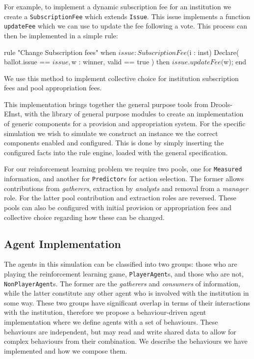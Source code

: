 For example, to implement a dynamic subscription fee for an institution we
create a \texttt{SubscriptionFee} which extends \texttt{Issue}. This issue
implements a function \texttt{updateFee} which we can use to update the fee
following a vote. This process can then be implemented in a simple rule:

\begin{droolsinline}
rule "Change Subscription fees"
	when
		$issue : SubscriptionFee($i : inst)
		Declare( ballot.issue == $issue, $w : winner, valid == true )
	then
		$issue.updateFee($w);
end
\end{droolsinline}

We use this method to implement collective choice for institution subscription
fees and pool appropriation fees.


This implementation brings together the general purpose tools from Drools-
EInst, with the library of general purpose modules to create an implementation
of generic components for a provision and appropriation system. For the
specific simulation we wish to simulate we construct an instance we the
correct components enabled and configured. This is done by simply inserting
the configured facts into the rule engine, loaded with the general
specification.

For our reinforcement learning problem we require two pools, one for
\texttt{Measured} information, and another for \texttt{Predictor}s for action
selection. The former allows contributions from \emph{gatherers}, extraction
by \emph{analysts} and removal from a \emph{manager} role. For the latter pool
contribution and extraction roles are reversed. These pools can also be
configured with initial provision or appropriation fees and collective choice
regarding how these can be changed.

\subsection{Agent Implementation}

The agents in this simulation can be classified into two groups: those who are
playing the reinforcement learning game, \texttt{PlayerAgent}s, and those who
are not, \texttt{NonPlayerAgent}s. The former are the \emph{gatherers} and
\emph{consumers} of information, while the latter constitute any other agent
who is involved with the institution in some way. These two groups have
significant overlap in terms of their interactions with the institution,
therefore we propose a behaviour-driven agent implementation where we define
agents with a set of behaviours. These behaviours are independent, but may
read and write shared data to allow for complex behaviours from their
combination. We describe the behaviours we have implemented and how we compose
them.

